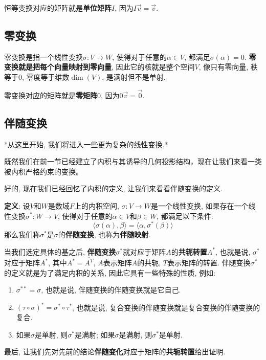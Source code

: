 \documentclass{ctexart}
\begin{document}
恒等变换对应的矩阵就是\textbf{单位矩阵}$I$, 因为$I\vec{v} = \vec{v}$.

\subsection{零变换}

零变换是指一个线性变换$\sigma: V \to W$, 使得对于任意的$\alpha \in V$, 都满足$\sigma(\alpha) = 0$. \textbf{零变换就是把每个向量映射到零向量}, 因此它的核就是整个空间$V$, 像只有零向量, 秩等于$0$, 零度等于维数$\dim(V)$, 是满射但不是单射.

零变换对应的矩阵就是\textbf{零矩阵}$\text{0}$, 因为$\text{0}\vec{v} = \vec{0}$.

\subsection{伴随变换}

*从这里开始, 我们将进入一些更为复杂的线性变换.*

既然我们在前一节已经建立了内积与其诱导的几何投影结构，现在让我们来看一类被内积严格约束的变换。

好的, 现在我们已经回忆了内积的定义, 让我们来看看伴随变换的定义.

\textbf{定义}: 设$V$和$W$是数域$F$上的内积空间, $\sigma: V \to W$是一个线性变换, 如果存在一个线性变换$\sigma^*: W \to V$, 使得对于任意的$\alpha \in V$和$\beta \in W$, 都满足以下条件:
$$\langle \sigma(\alpha), \beta \rangle = \langle \alpha, \sigma^*(\beta) \rangle$$
那么我们称$\sigma^*$是$\sigma$的\textbf{伴随变换}, 也称为\textbf{伴随映射}.

当我们选定具体的基之后, \textbf{伴随变换}$\sigma^*$就对应于矩阵$A$的\textbf{共轭转置}$A^*$, 也就是说, $\sigma^*$对应于矩阵$A^*$, 其中$A^* = \overline{A^T}$, $\overline{A}$表示矩阵$A$的共轭, $T$表示矩阵的转置. 伴随变换$\sigma^*$的定义就是为了满足内积的关系, 因此它具有一些特殊的性质, 例如:

\begin{enumerate}
\item $\sigma^{**} = \sigma$, 也就是说, 伴随变换的伴随变换就是它自己.
\item $(\tau \circ \sigma)^* = \sigma^* \circ \tau^*$, 也就是说, 复合变换的伴随变换就是复合变换的伴随变换的复合.
\item 如果$\sigma$是单射, 则$\sigma^*$是满射; 如果$\sigma$是满射, 则$\sigma^*$是单射.
\end{enumerate}

最后, 让我们先对先前的结论\textbf{伴随变化}对应于矩阵的\textbf{共轭转置}给出证明.
\end{document}
